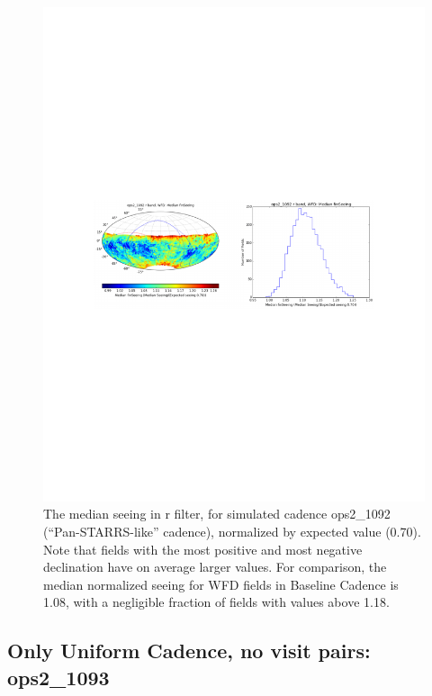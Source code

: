 \begin{figure}[t!]
\vskip -3.9in
\hskip -0.5in
\includegraphics[angle=0,width=1.19\hsize:,clip]{figs/PS-seeing.pdf}
\vskip -4.0in
\caption{The median seeing in r filter, for simulated cadence ops2\_1092 (``Pan-STARRS-like'' cadence),
normalized by expected value (0.70). Note that fields with the most positive and most negative
declination have on average larger values. For comparison, the median normalized seeing for WFD fields
in Baseline Cadence is 1.08, with a negligible fraction of fields with values above 1.18.}
\label{fig:PS-seeing}
\end{figure}



\subsection{Only Uniform Cadence, no visit pairs: ops2\_1093}


